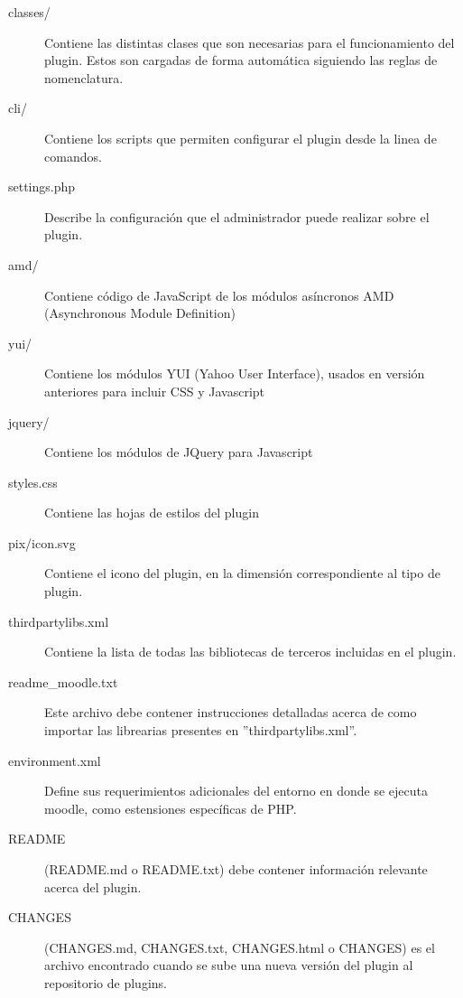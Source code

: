 \begin{description}
    \item[classes/] Contiene las distintas clases que son necesarias para el funcionamiento del plugin. Estos son cargadas de forma automática siguiendo las reglas de nomenclatura.

    \item[cli/] Contiene los scripts que permiten configurar el plugin desde la linea de comandos.

    \item[settings.php] Describe la configuración que el administrador puede realizar sobre el plugin.

    \item[amd/] Contiene código de JavaScript de los módulos asíncronos AMD (Asynchronous Module Definition)

    \item[yui/] Contiene los módulos YUI (Yahoo User Interface), usados en versión anteriores para incluir CSS y Javascript

    \item[jquery/] Contiene los módulos de JQuery para Javascript
    \item[styles.css] Contiene las hojas de estilos del plugin
    \item[pix/icon.svg] Contiene el icono del plugin, en la dimensión correspondiente al tipo de plugin.

    \item[thirdpartylibs.xml] Contiene la lista de todas las bibliotecas de terceros incluidas en el plugin.
    \item[readme\_moodle.txt] Este archivo debe contener instrucciones detalladas acerca de como importar las librearias presentes en ''thirdpartylibs.xml''.

    \item[environment.xml] Define sus requerimientos adicionales del entorno en donde se ejecuta moodle, como estensiones específicas de PHP.

    \item[README] (README.md o README.txt) debe contener información relevante acerca del plugin.
    \item[CHANGES] (CHANGES.md, CHANGES.txt, CHANGES.html o CHANGES) es el archivo encontrado cuando se sube una nueva versión del plugin al repositorio de plugins.
\end{description}

